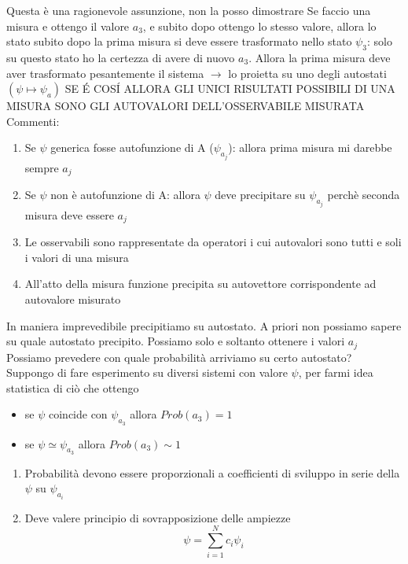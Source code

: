 Questa è una ragionevole assunzione, non la posso dimostrare \newline
Se faccio una misura e ottengo il valore $a_3$, e subito dopo ottengo lo stesso valore, allora lo stato subito dopo la prima misura si deve essere trasformato nello stato $\psi_3$: solo su questo stato ho la certezza di avere di nuovo $a_3$. Allora la prima misura deve aver trasformato pesantemente il sistema $\rightarrow$ lo proietta su uno degli autostati $(\psi \mapsto \psi_a)$ \newline
SE \'E COS\'I ALLORA GLI UNICI RISULTATI POSSIBILI DI UNA MISURA SONO GLI AUTOVALORI DELL'OSSERVABILE MISURATA \newline
Commenti:
\begin{enumerate}
    \item Se $\psi$ generica fosse autofunzione di A ($\psi_{a_j}$): allora prima misura mi darebbe sempre $a_j$
    \item Se $\psi$ non è autofunzione di A: allora $\psi$ deve precipitare su $\psi_{a_j}$ perchè seconda misura deve essere $a_j$
    \item Le osservabili sono rappresentate da operatori i cui autovalori sono tutti e soli i valori di una misura
    \item All'atto della misura funzione precipita su autovettore corrispondente ad autovalore misurato
\end{enumerate}
In maniera imprevedibile precipitiamo su autostato. A priori non possiamo sapere su quale autostato precipito. Possiamo solo e soltanto ottenere i valori $a_j$ \newline
Possiamo prevedere con quale probabilità arriviamo su certo autostato? \newline
Suppongo di fare esperimento su diversi sistemi con valore $\psi$, per farmi idea statistica di ciò che ottengo
\begin{itemize}
    \item se $\psi$ coincide con $\psi_{a_3}$ allora $Prob(a_3)=1$
    \item se $\psi \simeq \psi_{a_3}$ allora $Prob(a_3)\sim 1$
\end{itemize}
\begin{enumerate}
    \item Probabilità devono essere proporzionali a coefficienti di sviluppo in serie della $\psi$ su $\psi_{a_i}$
    \item Deve valere principio di sovrapposizione delle ampiezze
    \begin{equation*}
        \psi = \sum_{i=1}^N c_i\psi_i
    \end{equation*}
\end{enumerate}
